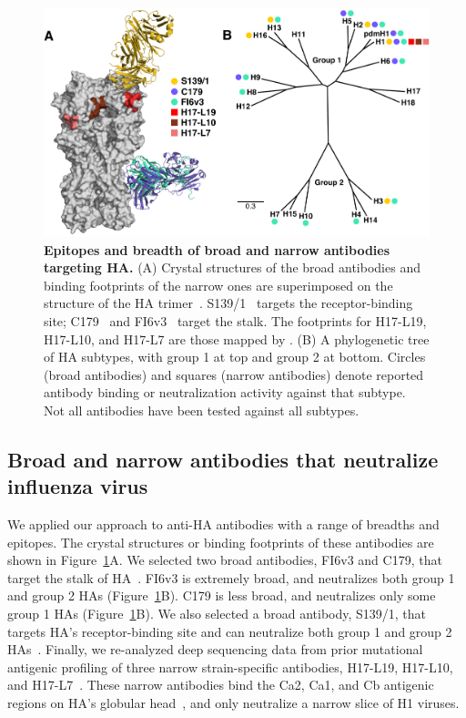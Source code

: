 \documentclass[11pt]{article}
\begin{document}
\begin{figure}
\centerline{\includegraphics[width=\textwidth]{figs/antibody_summary_fig/Ab_summary.pdf}}
\caption{\label{fig:antibody_summary}
{\bf Epitopes and breadth of broad and narrow antibodies targeting HA.}
(A) Crystal structures of the broad antibodies and binding footprints of the narrow ones are superimposed on the structure of the HA trimer~\citep[PDB 1RVX;][]{gamblin2004structure}. 
S139/1~\citep[PDB 4GMS;][]{lee2012heterosubtypic} targets the receptor-binding site; C179~\citep[PDB 4HLZ;][]{dreyfus2013structure} and FI6v3~\citep[PDB 3ZTN;][]{corti2011neutralizing} target the stalk. 
The footprints for H17-L19, H17-L10, and H17-L7 are those mapped by \citet{doud2017complete}. 
(B) A phylogenetic tree of HA subtypes, with group 1 at top and group 2 at bottom.
Circles (broad antibodies) and squares (narrow antibodies) denote reported antibody binding or neutralization activity against that subtype. 
Not all antibodies have been tested against all subtypes. 
}
\end{figure}

\subsection*{Broad and narrow antibodies that neutralize influenza virus}
We applied our approach to anti-HA antibodies with a range of breadths and epitopes.
The crystal structures or binding footprints of these antibodies are shown in Figure~\ref{fig:antibody_summary}A.
We selected two broad antibodies, FI6v3 and C179, that target the stalk of HA~\citep{corti2011neutralizing, okuno1993common, dreyfus2013structure}. 
FI6v3 is extremely broad, and neutralizes both group 1 and group 2 HAs (Figure~\ref{fig:antibody_summary}B).
C179 is less broad, and neutralizes only some group 1 HAs (Figure~\ref{fig:antibody_summary}B).
We also selected a broad antibody, S139/1, that targets HA's receptor-binding site and can neutralize both group 1 and group 2 HAs~\citep{yoshida2009cross, lee2012heterosubtypic}.
Finally, we re-analyzed deep sequencing data from prior mutational antigenic profiling of three narrow strain-specific antibodies, H17-L19, H17-L10, and H17-L7~\citep{doud2017complete}.
These narrow antibodies bind the Ca2, Ca1, and Cb antigenic regions on HA's globular head~\citep{caton1982antigenic}, and only neutralize a narrow slice of H1 viruses.
\end{document}
